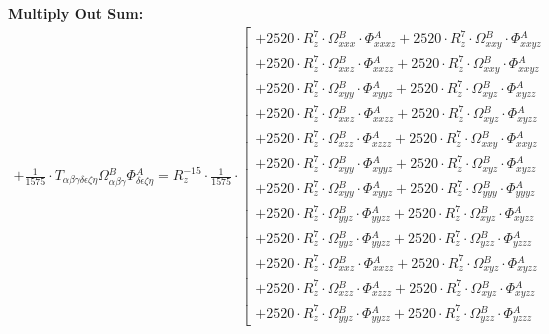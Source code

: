\documentclass{article}
\begin{document}
\textbf{Multiply Out Sum:}
\begin{subequations}\begin{gather}
+ \frac{1}{1575} \cdot T_{\alpha{}\beta{}\gamma{}\delta{}\epsilon{}\zeta{}\eta{}} \Omega{}^{B}_{\alpha{}\beta{}\gamma{}} \Phi{}^{A}_{\delta{}\epsilon{}\zeta{}\eta{}} = R_{z}^{-15} \cdot \frac{1}{1575} \cdot  \left[ \begin{array}{c} 
 		+ 2520 \cdot R_{z}^{7} \cdot \Omega{}^{B}_{xxx} \cdot \Phi{}^{A}_{xxxz}+ 2520 \cdot R_{z}^{7} \cdot \Omega{}^{B}_{xxy} \cdot \Phi{}^{A}_{xxyz} 
 \\[0.2em] 		 + 2520 \cdot R_{z}^{7} \cdot \Omega{}^{B}_{xxz} \cdot \Phi{}^{A}_{xxzz}+ 2520 \cdot R_{z}^{7} \cdot \Omega{}^{B}_{xxy} \cdot \Phi{}^{A}_{xxyz} 
 \\[0.2em] 		 + 2520 \cdot R_{z}^{7} \cdot \Omega{}^{B}_{xyy} \cdot \Phi{}^{A}_{xyyz}+ 2520 \cdot R_{z}^{7} \cdot \Omega{}^{B}_{xyz} \cdot \Phi{}^{A}_{xyzz} 
 \\[0.2em] 		 + 2520 \cdot R_{z}^{7} \cdot \Omega{}^{B}_{xxz} \cdot \Phi{}^{A}_{xxzz}+ 2520 \cdot R_{z}^{7} \cdot \Omega{}^{B}_{xyz} \cdot \Phi{}^{A}_{xyzz} 
 \\[0.2em] 		 + 2520 \cdot R_{z}^{7} \cdot \Omega{}^{B}_{xzz} \cdot \Phi{}^{A}_{xzzz}+ 2520 \cdot R_{z}^{7} \cdot \Omega{}^{B}_{xxy} \cdot \Phi{}^{A}_{xxyz} 
 \\[0.2em] 		 + 2520 \cdot R_{z}^{7} \cdot \Omega{}^{B}_{xyy} \cdot \Phi{}^{A}_{xyyz}+ 2520 \cdot R_{z}^{7} \cdot \Omega{}^{B}_{xyz} \cdot \Phi{}^{A}_{xyzz} 
 \\[0.2em] 		 + 2520 \cdot R_{z}^{7} \cdot \Omega{}^{B}_{xyy} \cdot \Phi{}^{A}_{xyyz}+ 2520 \cdot R_{z}^{7} \cdot \Omega{}^{B}_{yyy} \cdot \Phi{}^{A}_{yyyz} 
 \\[0.2em] 		 + 2520 \cdot R_{z}^{7} \cdot \Omega{}^{B}_{yyz} \cdot \Phi{}^{A}_{yyzz}+ 2520 \cdot R_{z}^{7} \cdot \Omega{}^{B}_{xyz} \cdot \Phi{}^{A}_{xyzz} 
 \\[0.2em] 		 + 2520 \cdot R_{z}^{7} \cdot \Omega{}^{B}_{yyz} \cdot \Phi{}^{A}_{yyzz}+ 2520 \cdot R_{z}^{7} \cdot \Omega{}^{B}_{yzz} \cdot \Phi{}^{A}_{yzzz} 
 \\[0.2em] 		 + 2520 \cdot R_{z}^{7} \cdot \Omega{}^{B}_{xxz} \cdot \Phi{}^{A}_{xxzz}+ 2520 \cdot R_{z}^{7} \cdot \Omega{}^{B}_{xyz} \cdot \Phi{}^{A}_{xyzz} 
 \\[0.2em] 		 + 2520 \cdot R_{z}^{7} \cdot \Omega{}^{B}_{xzz} \cdot \Phi{}^{A}_{xzzz}+ 2520 \cdot R_{z}^{7} \cdot \Omega{}^{B}_{xyz} \cdot \Phi{}^{A}_{xyzz} 
 \\[0.2em] 		 + 2520 \cdot R_{z}^{7} \cdot \Omega{}^{B}_{yyz} \cdot \Phi{}^{A}_{yyzz}+ 2520 \cdot R_{z}^{7} \cdot \Omega{}^{B}_{yzz} \cdot \Phi{}^{A}_{yzzz} 

\end{array}
\end{gather}
\end{subequations}
\end{document}
